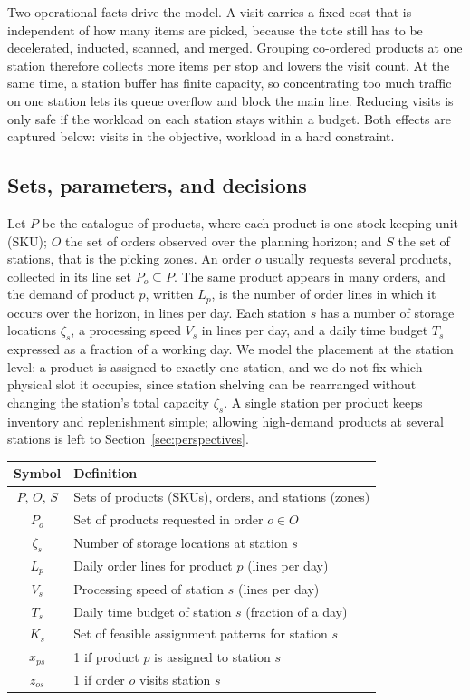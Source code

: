 \documentclass[]{interact}
\begin{document}
Two operational facts drive the model. A visit carries a fixed cost that is independent of how many items are picked, because the tote still has to be decelerated, inducted, scanned, and merged. Grouping co-ordered products at one station therefore collects more items per stop and lowers the visit count. At the same time, a station buffer has finite capacity, so concentrating too much traffic on one station lets its queue overflow and block the main line. Reducing visits is only safe if the workload on each station stays within a budget. Both effects are captured below: visits in the objective, workload in a hard constraint.

\subsection{Sets, parameters, and decisions}
Let $P$ be the catalogue of products, where each product is one stock-keeping unit (SKU); $O$ the set of orders observed over the planning horizon; and $S$ the set of stations, that is the picking zones. An order $o$ usually requests several products, collected in its line set $P_o \subseteq P$. The same product appears in many orders, and the demand of product $p$, written $L_p$, is the number of order lines in which it occurs over the horizon, in lines per day. Each station $s$ has a number of storage locations $\zeta_s$, a processing speed $V_s$ in lines per day, and a daily time budget $T_s$ expressed as a fraction of a working day. We model the placement at the station level: a product is assigned to exactly one station, and we do not fix which physical slot it occupies, since station shelving can be rearranged without changing the station's total capacity $\zeta_s$. A single station per product keeps inventory and replenishment simple; allowing high-demand products at several stations is left to Section~\ref{sec:perspectives}.

\begin{table}[t]
\centering
{}
{\begin{tabular}{@{}cl@{}}
\toprule
Symbol & Definition \\
\midrule
$P,\,O,\,S$ & Sets of products (SKUs), orders, and stations (zones) \\
$P_o$       & Set of products requested in order $o \in O$ \\
$\zeta_s$   & Number of storage locations at station $s$ \\
$L_p$       & Daily order lines for product $p$ (lines per day) \\
$V_s$       & Processing speed of station $s$ (lines per day) \\
$T_s$       & Daily time budget of station $s$ (fraction of a day) \\
$K_s$       & Set of feasible assignment patterns for station $s$ \\
$x_{ps}$    & 1 if product $p$ is assigned to station $s$ \\
$z_{os}$    & 1 if order $o$ visits station $s$ \\
\bottomrule
\end{tabular}}
\label{tab:notation}
\end{table}
\end{document}
